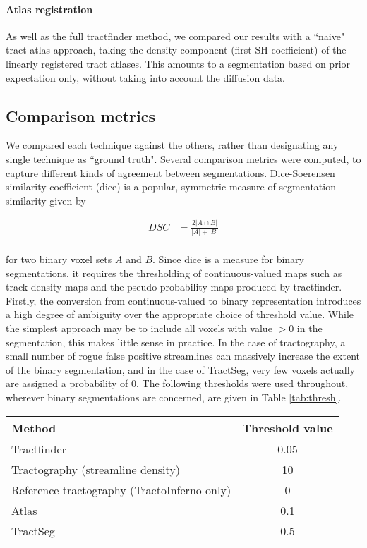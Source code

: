 \paragraph*{Atlas registration}

As well as the full tractfinder method, we compared our results with a ``naive" tract atlas approach, taking the density component (first SH coefficient) of the linearly registered tract atlases.
This amounts to a segmentation based on prior expectation only, without taking into account the diffusion data.

\subsection{Comparison metrics}

We compared each technique against the others, rather than designating any single technique as ``ground truth".
Several comparison metrics were computed, to capture different kinds of agreement between segmentations.
Dice-Soerensen similarity coefficient (\gls{dice}) \autocite{Dice1945} is a popular, symmetric measure of segmentation similarity given by

\begin{align}
  DSC &= \frac{2 |A \cap B|}{|A| + |B|} \\
\end{align}

for two binary voxel sets $A$ and $B$.
Since \gls{dice} is a measure for binary segmentations, it requires the thresholding of continuous-valued maps such as track density maps and the pseudo-probability maps produced by tractfinder.
Firstly, the conversion from continuous-valued to binary representation introduces a high degree of ambiguity over the appropriate choice of threshold value.
While the simplest approach may be to include all voxels with value $>0$ in the segmentation, this makes little sense in practice.
In the case of tractography, a small number of rogue false positive streamlines can massively increase the extent of the binary segmentation, and in the case of TractSeg, very few voxels actually are assigned a probability of 0.
The following thresholds were used throughout, wherever binary segmentations are concerned, are given in Table \ref{tab:thresh}.

\begin{tabularx}{0.5\textwidth}{X c}
  Method    & Threshold value \\
  \hline
  Tractfinder   & 0.05 \\
  Tractography (streamline density)  & 10 \\
  Reference tractography (TractoInferno only) & 0 \\
  Atlas         & 0.1 \\
  TractSeg      & 0.5 \\
  \hline
\end{tabularx}

